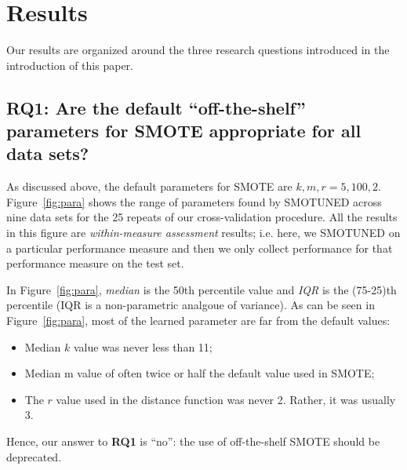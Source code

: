 \documentclass[10pt,conference]{IEEEtran}
\newcommand{\bi}{\begin{itemize}[leftmargin=0.4cm]}
\newcommand{\ei}{\end{itemize}}
\theoremstyle{break}
\theoremstyle{break}
\begin{document}
 
   

\section{Results}
\label{sect:results}

Our results are organized around the three
research questions introduced in the introduction
of this paper.

 \subsection{{\bf RQ1}: Are the default ``off-the-shelf'' parameters for SMOTE appropriate for all
 data sets?}
 
 
 As discussed above, the default parameters for
 SMOTE are $k,m, r = 5,100,2$.
  Figure~\ref{fig:para} shows the range of parameters
 found by SMOTUNED across  nine data sets for the 25 repeats of our cross-validation procedure.
 All the results in this figure are {\em within-measure assessment} results; i.e.
 here, we SMOTUNED  on a particular performance measure and then we only collect performance for that performance measure on the test set.
 
 
 In  Figure~\ref{fig:para}, {\em median} is the 50th percentile
 value and {\em IQR} is the (75-25)th percentile
 (IQR is a non-parametric analgoue of variance).
 As can be seen in Figure~\ref{fig:para}, most of the learned parameter are far from the default values:
 \bi
 \item 
 Median $k$ value was never less than 11;
 \item
 Median m value of often twice or half the default value used in SMOTE;
 \item
 The $r$ value used in the distance function was never 2. Rather, it was usually 3.
 \ei
 Hence,  our answer to {\bf RQ1} is ``no'': the use of off-the-shelf SMOTE should be deprecated. 
 
\end{document}
